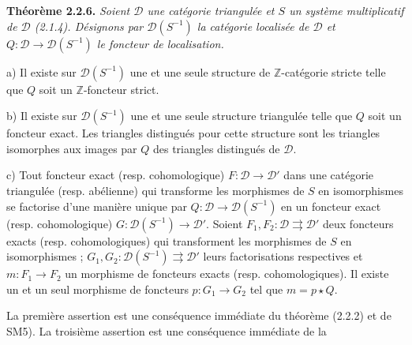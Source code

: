 \smallskip
\noindent\textbf{Théorème 2.2.6.}\quad
\begingroup\itshape
{}%
Soient $\mathcal D$ une catégorie triangulée et $S$ un système multiplicatif
de $\mathcal D$ (2.1.4). Désignons par $\mathcal D(S^{-1})$ la catégorie
localisée de $\mathcal D$ et
$Q\colon\mathcal D\longrightarrow\mathcal D(S^{-1})$ le foncteur de
localisation.

\par\noindent a) Il existe sur $\mathcal D(S^{-1})$ une et une seule structure
de $\mathbb Z$-catégorie stricte telle que $Q$ soit un $\mathbb Z$-foncteur
strict.

\par\noindent b) Il existe sur $\mathcal D(S^{-1})$ une et une seule structure
triangulée telle que $Q$ soit un foncteur exact. Les triangles distingués
pour cette structure sont les triangles isomorphes aux images par $Q$ des
triangles distingués de $\mathcal D$.

\par\noindent c) Tout foncteur exact (resp. cohomologique)
$F\colon\mathcal D\longrightarrow\mathcal D'$ dans une catégorie triangulée
(resp. abélienne) qui transforme les morphismes de $S$ en isomorphismes se
factorise d'une manière unique par
$Q\colon\mathcal D\longrightarrow\mathcal D(S^{-1})$ en un foncteur exact
(resp. cohomologique)
$G\colon\mathcal D(S^{-1})\longrightarrow\mathcal D'$.
%
Soient $F_1,F_2\colon\mathcal D\rightrightarrows\mathcal D'$ deux foncteurs
exacts (resp. cohomologiques) qui transforment les morphismes de $S$ en
isomorphismes ;
$G_1,G_2\colon\mathcal D(S^{-1})\rightrightarrows\mathcal D'$ leurs
factorisations respectives et
$m\colon F_1\longrightarrow F_2$ un morphisme de foncteurs exacts
(resp. cohomologiques). Il existe un et un seul morphisme de foncteurs
$p\colon G_1\longrightarrow G_2$ tel que $m=p\star Q$.
\endgroup

\par\noindent La première assertion est une conséquence immédiate du théorème
(2.2.2) et de SM5).
%
La troisième assertion est une conséquence immédiate de la

\endgroup
